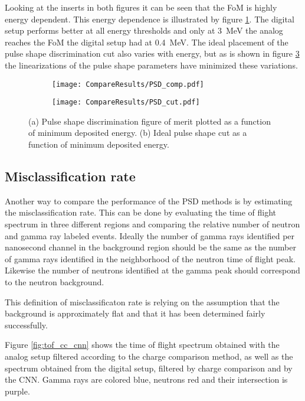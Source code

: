 \documentclass[main.tex]{subfiles}
\begin{document}
Looking at the inserts in both figures it can be seen that the FoM is highly energy dependent. This energy dependence is illustrated by figure \ref{fig:psd_fom_trend}. The digital setup performs better at all energy thresholds and only at \SI{3}{MeV} the analog reaches the FoM the digital setup had at \SI{0.4}{\MeV}. The ideal placement of the pulse shape discrimination cut also varies with energy, but as is shown in figure \ref{fig:psd_cut_trend} the linearizations of the pulse shape parameters have minimized these variations.
\begin{figure}[ht]
	\begin{subfigure}[b]{\textwidth}
	    \centering
    	\texttt{[image: CompareResults/PSD\_comp.pdf]}
        \caption{}
	    \label{fig:psd_fom_trend} 
	\end{subfigure}
	\begin{subfigure}[b]{\textwidth}
    	\centering
        \texttt{[image: CompareResults/PSD\_cut.pdf]}
        \caption{}
    	\label{fig:psd_cut_trend} 
    \end{subfigure}
    \caption{(a) Pulse shape discrimination figure of merit plotted as a function of minimum deposited energy. (b) Ideal pulse shape cut as a function of minimum deposited energy.}
\end{figure}


\subsection{Misclassification rate}
Another way to compare the performance of the PSD methods is by estimating the misclassification rate. This can be done by evaluating the time of flight spectrum in three different regions and comparing the relative number of neutron and gamma ray labeled events. Ideally the number of gamma rays identified per nanosecond channel in the background region should be the same as the number of gamma rays identified in the neighborhood of the neutron time of flight peak. Likewise the number of neutrons identified at the gamma peak should correspond to the neutron background.

This definition of misclassificaton rate is relying on the assumption that the background is approximately flat and that it has been determined fairly successfully.

Figure \ref{fig:tof_cc_cnn} shows the time of flight spectrum obtained with the analog setup filtered according to the charge comparison method, as well as the spectrum obtained from the digital setup, filtered by charge comparison and by the CNN. Gamma rays are colored blue, neutrons red and their intersection is purple. 
\end{document}
